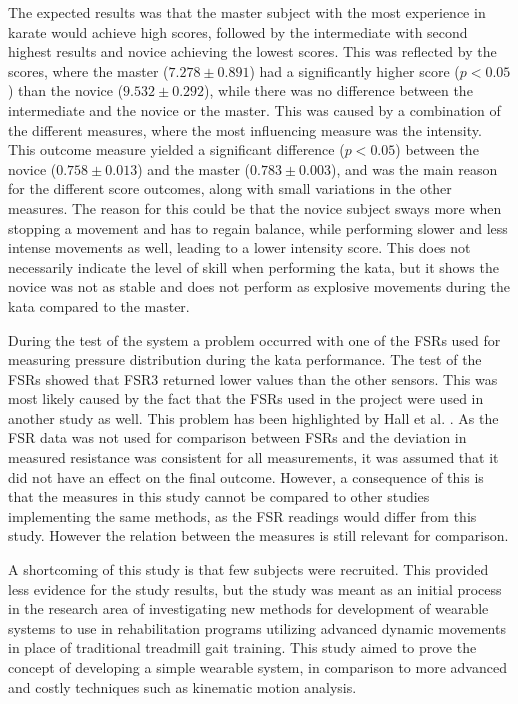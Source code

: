 
The expected results was that the master subject with the most experience in karate would achieve high scores, followed by the intermediate with second highest results and novice achieving the lowest scores. This was reflected by the scores, where the master ($7.278 \pm 0.891$) had a significantly higher score ($p<0.05$) than the novice ($9.532 \pm 0.292$), while there was no difference between the intermediate and the novice or the master. This was caused by a combination of the different measures, where the most influencing measure was the intensity. This outcome measure yielded a significant difference ($p<0.05$) between the novice ($0.758 \pm 0.013$) and the master ($0.783 \pm 0.003$), and was the main reason for the different score outcomes, along with small variations in the other measures. The reason for this could be that the novice subject sways more when stopping a movement and has to regain balance, while performing slower and less intense movements as well, leading to a lower intensity score. This does not necessarily indicate the level of skill when performing the kata, but it shows the novice was not as stable and does not perform as explosive movements during the kata compared to the master.

During the test of the system a problem occurred with one of the FSRs used for measuring pressure distribution during the kata performance. The test of the FSRs showed that FSR3 returned lower values than the other sensors. This was most likely caused by the fact that the FSRs used in the project were used in another study as well. This problem has been highlighted by Hall et al. \cite{Hall2008}. As the FSR data was not used for comparison between FSRs and the deviation in measured resistance was consistent for all measurements, it was assumed that it did not have an effect on the final outcome. However, a consequence of this is that the measures in this study cannot be compared to other studies implementing the same methods, as the FSR readings would differ from this study. However the relation between the measures is still relevant for comparison.

A shortcoming of this study is that few subjects were recruited. This provided less evidence for the study results, but the study was meant as an initial process in the research area of investigating new methods for development of wearable systems to use in rehabilitation programs utilizing advanced dynamic movements in place of traditional treadmill gait training. This study aimed to prove the concept of developing a simple wearable system, in comparison to more advanced and costly techniques such as kinematic motion analysis. 

